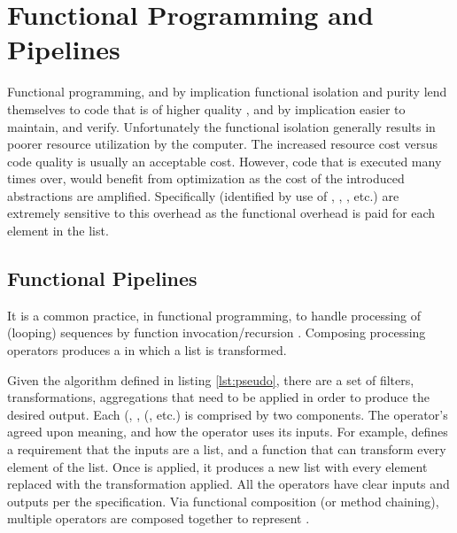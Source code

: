 \section{Functional Programming and Pipelines}
Functional programming, and by implication functional isolation and purity lend themselves to code that is of higher quality \cite{langstudy14}, and by implication easier to maintain, and verify. Unfortunately the functional isolation generally results in poorer resource utilization by the computer. The increased resource cost versus code quality is usually an acceptable cost. However, code that is executed many times over, would benefit from optimization as the cost of the introduced abstractions are amplified. Specifically \pipelines (identified by use of , , , etc.) are extremely sensitive to this overhead as the functional overhead is paid for each element in the list.

\subsection{Functional Pipelines}
It is a common practice, in functional programming, to handle processing of (looping) sequences by function invocation/recursion \cite{recurse16}.  Composing processing operators produces a \pipeline in which a list is transformed.  

\begin{minipage}{\linewidth}

\end{minipage} 

Given the algorithm defined in listing \ref{lst:pseudo}, there are a set of filters, transformations, aggregations that need to be applied in order to produce the desired output.  Each \pipelineoperator (, , (, etc.) is comprised by two components.  The operator's agreed upon meaning, and how the operator uses its inputs. For example,  defines a requirement that the inputs are a list, and a function that can transform every element of the list.  Once  is applied, it produces a new list with every element replaced with the transformation applied. All the operators have clear inputs and outputs per the \javascript specification.  Via functional composition (or method chaining), multiple operators are composed together to represent \pipelines.  

